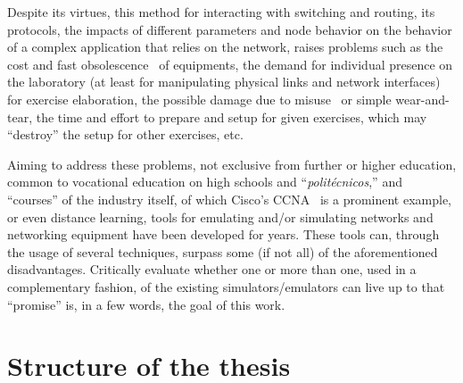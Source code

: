 Despite its virtues, this method for interacting with switching and routing, its protocols, the impacts of different parameters and node behavior on the behavior of a complex application that relies on the network, raises problems such as the cost and fast obsolescence~\cite{automaticnetconfiggns} of equipments, the demand for individual presence on the laboratory (at least for manipulating physical links and network interfaces) for exercise elaboration, the possible damage due to misuse~\cite{teachinginovation} or simple wear-and-tear, the time and effort to prepare and setup for given exercises, which may ``destroy'' the setup for other exercises, etc. %

Aiming to address these problems, not exclusive from further or higher education, common to vocational education on high schools and ``\emph{politécnicos},'' and ``courses'' of the industry itself, of which Cisco's CCNA~\cite{ccna} is a prominent example, or even distance learning, tools for emulating and/or simulating networks and networking equipment have been developed for years. %
These tools can, through the usage of several techniques, surpass some (if not all) of the aforementioned disadvantages.
Critically evaluate whether one or more than one, used in a complementary fashion, of the existing simulators/emulators can live up to that ``promise'' is, in a few words, the goal of this work.



\section{Structure of the thesis}
\label{sec:structure}

